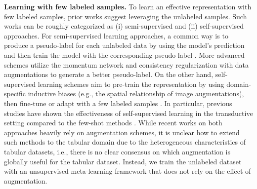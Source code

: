 \textbf{Learning with few labeled samples.} To learn an effective representation with few labeled samples, prior works suggest leveraging the unlabeled samples. Such works can be roughly categorized as (i) semi-supervised \citep{kim2020distribution,assran2021paws} and (ii) self-supervised \citep{chen2020simclr,chen2020big} approaches. For semi-supervised learning approaches, a common way is to produce a pseudo-label for each unlabeled data by using the model's prediction and then train the model with the corresponding pseudo-label \citep{lee2013pseudolabel}. More advanced schemes utilize the momentum network \citep{laine2017temporal,tarvainen2017meanteacher} and consistency regularization with data augmentations \citep{berthelot2019mixmatch,sohn2020fixmatch} to generate a better pseudo-label. On the other hand, self-supervised learning schemes aim to pre-train the representation by using domain-specific inductive biases (e.g., the spatial relationship of image augmentations), then fine-tune or adapt with a few labeled samples \citep{tian2020rethinking,perez2021true}. In particular, previous studies have shown the effectiveness of self-supervised learning in the transductive setting compared to the few-shot methods \citep{chen2021shot}. While recent works on both approaches heavily rely on augmentation schemes, it is unclear how to extend such methods to the tabular domain due to the heterogeneous characteristics of tabular datasets, i.e., there is no clear consensus on which augmentation is globally useful for the tabular dataset. Instead, we train the unlabeled dataset with an unsupervised meta-learning framework that does not rely on the effect of augmentation.

